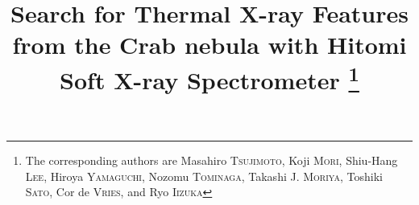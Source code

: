 \documentclass[]{pasj01}
\begin{document}
 

\title{Search for Thermal X-ray Features from the Crab nebula with Hitomi Soft X-ray Spectrometer
%
\thanks{The corresponding authors are
Masahiro \textsc{Tsujimoto},
Koji \textsc{Mori},
Shiu-Hang \textsc{Lee},
Hiroya \textsc{Yamaguchi},
Nozomu \textsc{Tominaga},
Takashi J. \textsc{Moriya},
Toshiki \textsc{Sato},
Cor de \textsc{Vries},
and
Ryo \textsc{Iizuka}
}
}
%




\maketitle
\end{document}
